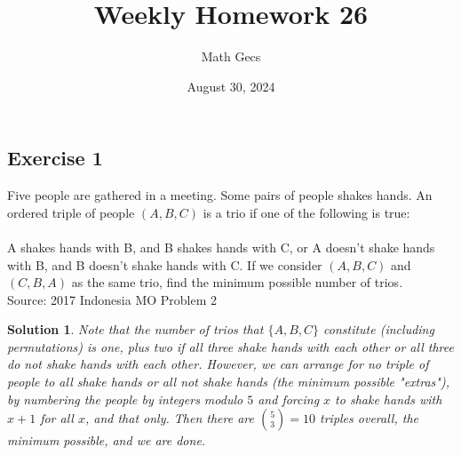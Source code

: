 \documentclass[12pt]{article}
\title{Weekly Homework 26}
\author{Math Gecs}
\date{August 30, 2024}
\newtheorem*{solution*}{Solution}
\begin{document}
\maketitle

\subsection*{Exercise 1}
Five people are gathered in a meeting. Some pairs of people shakes hands. An ordered triple of people $(A,B,C)$ is a trio if one of the following is true:
\\ \\
A shakes hands with B, and B shakes hands with C, or A doesn't shake hands with B, and B doesn't shake hands with C. If we consider $(A,B,C)$ and $(C,B,A)$ as the same trio, find the minimum possible number of trios.\\

Source: 2017 Indonesia MO Problem 2\\

\begin{solution*}
Note that the number of trios that $\{A, B, C\}$ constitute (including permutations) is one, plus two if all three shake hands with each other or all three do not shake hands with each other. However, we can arrange for no triple of people to all shake hands or all not shake hands (the minimum possible "extras"), by numbering the people by integers modulo $5$ and forcing $x$ to shake hands with $x + 1$ for all $x$, and that only. Then there are $\binom{5}{3} = 10$ triples overall, the minimum possible, and we are done.
\end{solution*}
\end{document}
